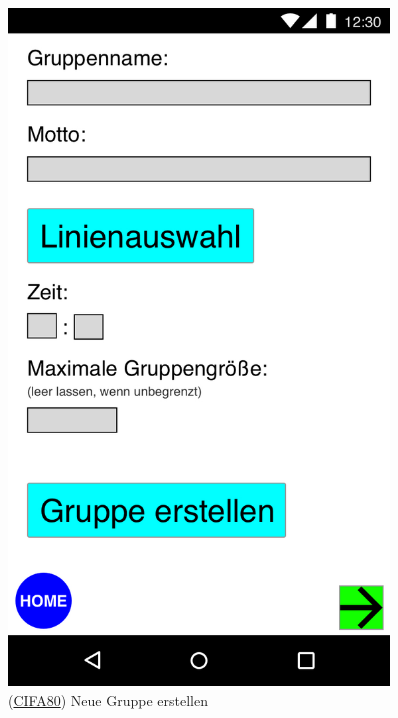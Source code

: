 \documentclass[a4paper]{scrreprt}
\begin{document}
\begin{figure}[H]
\begin{minipage}[b]{0.48\textwidth}
		\includegraphics[width=0.9\textwidth]{res/GUI/06.jpeg}
		\label{Fig.6}
		(\hyperlink{cifa80}{CIFA80}) Neue Gruppe erstellen
	\end{minipage}
\end{figure}
\end{document}
